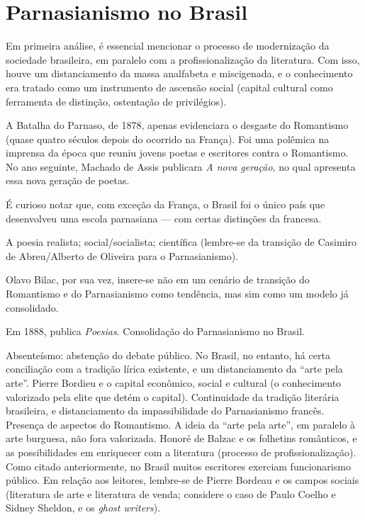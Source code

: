
\chapter{Parnasianismo no Brasil}

Em primeira análise, é essencial mencionar o processo de modernização da sociedade brasileira, em paralelo com a profissionalização da literatura. Com isso, houve um distanciamento da massa analfabeta e miscigenada, e o conhecimento era tratado como um instrumento de ascensão social (capital cultural como ferramenta de distinção, ostentação de privilégios).

A Batalha do Parnaso, de 1878, apenas evidenciara o desgaste do Romantismo (quase quatro séculos depois do ocorrido na França). Foi uma polêmica na imprensa da época que reuniu jovens poetas e escritores contra o Romantismo. No ano seguinte, Machado de Assis publicara \textit{A nova geração}, no qual apresenta essa nova geração de poetas.

É curioso notar que, com exceção da França, o Brasil foi o único país que desenvolveu uma escola parnasiana — com certas distinções da francesa.

A poesia realista; social/socialista; científica (lembre-se da transição de Casimiro de Abreu/Alberto de Oliveira para o Parnasianismo).

Olavo Bilac, por sua vez, insere-se não em um cenário de transição do Romantismo e do Parnasianismo como tendência, mas sim como um modelo já consolidado.

Em 1888, publica \textit{Poesias}. Consolidação do Parnasianismo no Brasil.

Absenteísmo: abstenção do debate público. No Brasil, no entanto, há certa conciliação com a tradição lírica existente, e um distanciamento da ``arte pela arte''. Pierre Bordieu e o capital econômico, social e cultural (o conhecimento valorizado pela elite que detém o capital). Continuidade da tradição literária brasileira, e distanciamento da impassibilidade do Parnasianismo francês. Presença de aspectos do Romantismo. A ideia da ``arte pela arte'', em paralelo à arte burguesa, não fora valorizada. Honoré de Balzac e os folhetins românticos, e as possibilidades em enriquecer com a literatura (processo de profissionalização). Como citado anteriormente, no Brasil muitos escritores exerciam funcionarismo público. Em relação aos leitores, lembre-se de Pierre Bordeau e os campos sociais (literatura de arte e literatura de venda; considere o caso de Paulo Coelho e Sidney Sheldon, e os \textit{ghost writers}).

